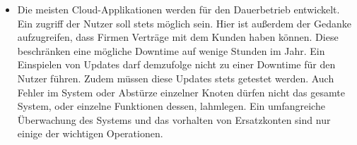 \begin{itemize}
    \item Die meisten Cloud-Applikationen werden für den Dauerbetrieb entwickelt. Ein zugriff der Nutzer soll stets möglich sein. Hier ist außerdem der Gedanke aufzugreifen, dass Firmen  Verträge mit dem Kunden haben können. Diese beschränken eine mögliche Downtime auf wenige Stunden im Jahr. Ein Einspielen von Updates darf demzufolge nicht zu einer Downtime für den Nutzer führen. Zudem müssen diese Updates stets getestet werden. Auch Fehler im System oder Abstürze einzelner Knoten dürfen nicht das gesamte System, oder einzelne Funktionen dessen, lahmlegen. Ein umfangreiche Überwachung des Systems und das vorhalten von Ersatzkonten sind nur einige der wichtigen Operationen. 
    
\end{itemize}